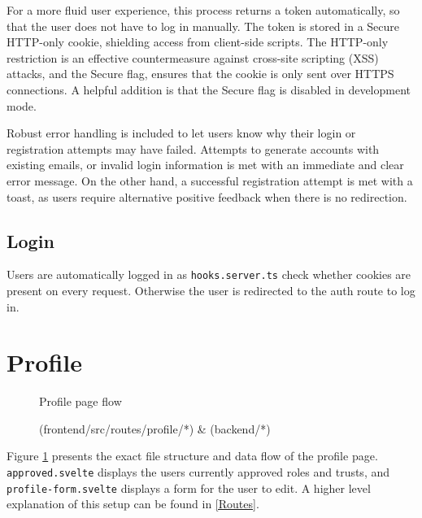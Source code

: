 For a more fluid user experience, this process returns a token automatically, so that the user does not have to log in manually. The token is stored in a Secure HTTP-only cookie, shielding access from client-side scripts. The HTTP-only restriction is an effective countermeasure against cross-site scripting (XSS) attacks, and the Secure flag, ensures that the cookie is only sent over HTTPS connections. A helpful addition is that the Secure flag is disabled in development mode.

Robust error handling is included to let users know why their login or registration attempts may have failed. Attempts to generate accounts with existing emails, or invalid login information is met with an immediate and clear error message. On the other hand, a successful registration attempt is met with a toast, as users require alternative positive feedback when there is no redirection.
\subsection{Login}

Users are automatically logged in as \texttt{hooks.server.ts} check whether cookies are present on every request. Otherwise the user is redirected to the auth route to log in.

\section{Profile}
\begin{figure}[h]
\centering
{}
\vspace{-20pt}
\caption{Profile page flow}
\vspace{-10pt}
\caption*{(frontend/src/routes/profile/*) \& (backend/*)}
\label{fig:profile-file-flow}
\vspace{-5pt}
\end{figure}

Figure \ref{fig:profile-file-flow} presents the exact file structure and data flow of the profile page. \texttt{approved.svelte} displays the users currently approved roles and trusts, and \texttt{profile-form.svelte} displays a form for the user to edit. A higher level explanation of this setup can be found in \ref{Routes}. 

